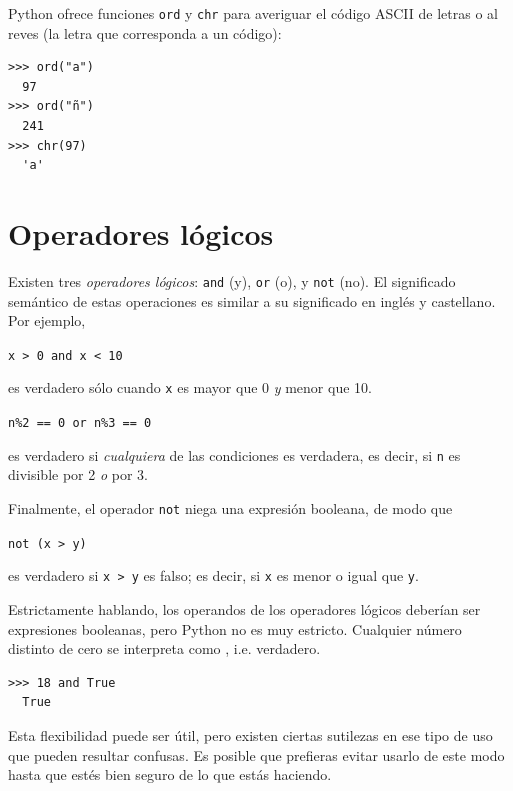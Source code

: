 Python ofrece funciones \texttt{ord} y \texttt{chr} para 
averiguar el código ASCII de letras o al reves (la letra que corresponda a un código):

\begin{Verbatim}[frame=single]
>>> ord("a")
  97
>>> ord("ñ")
  241
>>> chr(97)
  'a'
\end{Verbatim}


\hypertarget{operadores-luxf3gicos}{%
\section{Operadores lógicos}\label{operadores-luxf3gicos}}

 

Existen tres \emph{operadores lógicos}: \texttt{and} (y),
\texttt{or} (o), y \texttt{not} (no). El significado semántico de
estas operaciones es similar a su significado en inglés y castellano. Por ejemplo,

\texttt{x\ \textgreater{}\ 0\ and\ x\ \textless{}\ 10}

es verdadero sólo cuando \texttt{x} es mayor que 0 \emph{y} menor que
10.

  
  

\texttt{n\%2\ ==\ 0\ or\ n\%3\ ==\ 0} 

es verdadero si \emph{cualquiera}
de las condiciones es verdadera, es decir, si \texttt{n} es divisible por
2 \emph{o} por 3.

Finalmente, el operador \texttt{not} niega una expresión booleana, de
modo que 

\texttt{not\ (x\ >\ y)} 

es verdadero si
\texttt{x\ >\ y} es falso; es decir, si \texttt{x} es menor o igual
que \texttt{y}.

Estrictamente hablando, los operandos de los operadores lógicos deberían ser expresiones booleanas, pero Python no es muy estricto. Cualquier número distinto de cero se interpreta como 
, i.e. verdadero.

\begin{Verbatim}[frame=single]
>>> 18 and True
  True
\end{Verbatim}

Esta flexibilidad puede ser útil, pero existen ciertas sutilezas en ese
tipo de uso que pueden resultar confusas. Es posible que prefieras
evitar usarlo de este modo hasta que estés bien seguro de lo que estás
haciendo.

